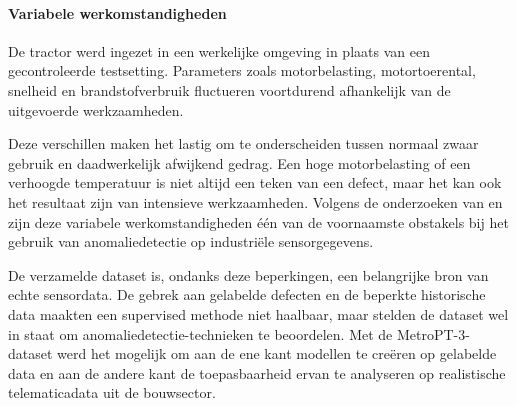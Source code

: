 
\paragraph{Variabele werkomstandigheden}

De tractor werd ingezet in een werkelijke omgeving in plaats van  een gecontroleerde testsetting. Parameters zoals motorbelasting, motortoerental, snelheid en brandstofverbruik fluctueren voortdurend afhankelijk van de uitgevoerde werkzaamheden.

Deze verschillen maken het lastig om te onderscheiden tussen normaal zwaar gebruik en daadwerkelijk afwijkend gedrag. Een hoge motorbelasting of een verhoogde temperatuur is niet altijd een teken van een defect, maar het kan ook het resultaat zijn van intensieve werkzaamheden. Volgens de onderzoeken van \textcite{Chen2025} en \textcite{Lu2026} zijn deze variabele werkomstandigheden één van de voornaamste obstakels bij het gebruik van anomaliedetectie op industriële sensorgegevens.

De verzamelde dataset is, ondanks deze beperkingen, een belangrijke bron van echte sensordata. De gebrek aan gelabelde defecten en de beperkte historische data maakten een supervised methode niet haalbaar, maar stelden de dataset wel in staat om anomaliedetectie-technieken te beoordelen. Met de MetroPT-3-dataset werd het mogelijk om aan de ene kant modellen te creëren op gelabelde data en aan de andere kant de toepasbaarheid ervan te analyseren op realistische telematicadata uit de bouwsector.

